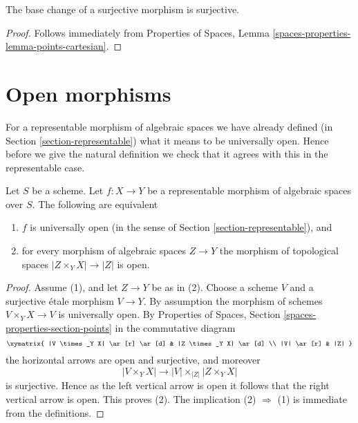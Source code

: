 \begin{lemma}
\label{lemma-base-change-surjective}
The base change of a surjective morphism is surjective.
\end{lemma}

\begin{proof}
Follows immediately from
Properties of Spaces, Lemma \ref{spaces-properties-lemma-points-cartesian}.
\end{proof}










\section{Open morphisms}
\label{section-open}

\noindent
For a representable morphism of algebraic spaces we have already defined (in
Section \ref{section-representable})
what it means to be universally open. Hence before we give the natural
definition we check that it agrees with this in the representable case.

\begin{lemma}
\label{lemma-characterize-representable-universally-open}
Let $S$ be a scheme. Let $f : X \to Y$ be a representable morphism of
algebraic spaces over $S$. The following are equivalent
\begin{enumerate}
\item $f$ is universally open
(in the sense of Section \ref{section-representable}), and
\item for every morphism of algebraic spaces $Z \to Y$ the morphism of
topological spaces $|Z \times_Y X| \to |Z|$ is open.
\end{enumerate}
\end{lemma}

\begin{proof}
Assume (1), and let $Z \to Y$ be as in (2). Choose a scheme $V$ and
a surjective \'etale morphism $V \to Y$. By assumption the morphism
of schemes $V \times_Y X \to V$ is universally open. By
Properties of Spaces, Section \ref{spaces-properties-section-points}
in the commutative diagram
$$
\xymatrix{
|V \times_Y X| \ar[r] \ar[d] & |Z \times_Y X| \ar[d] \\
|V| \ar[r] & |Z|
}
$$
the horizontal arrows are open and surjective, and moreover
$$
|V \times_Y X| \longrightarrow |V| \times_{|Z|} |Z \times_Y X|
$$
is surjective. Hence as the left
vertical arrow is open it follows that the right vertical arrow is
open. This proves (2). The implication (2) $\Rightarrow$ (1) is
immediate from the definitions.
\end{proof}

